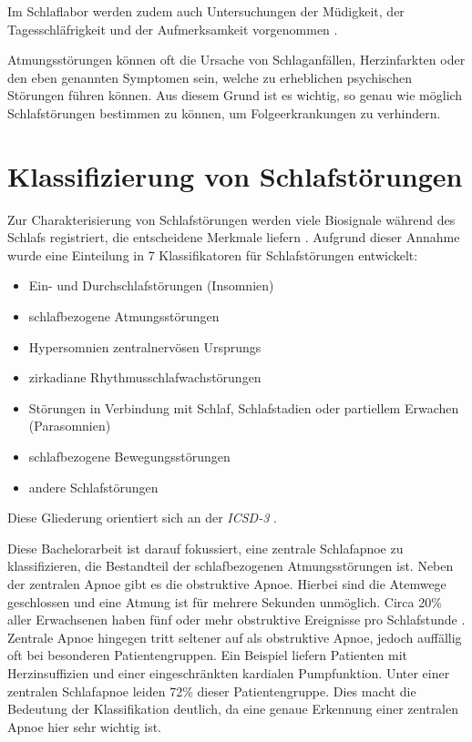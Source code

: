 Im Schlaflabor werden zudem auch Untersuchungen der Müdigkeit, der Tagesschläfrigkeit und der Aufmerksamkeit vorgenommen \cite{croenleinSchlafmedizin1x1Praxisorientiertes2017}.

Atmungsstörungen können oft die Ursache von Schlaganfällen, Herzinfarkten oder den eben genannten Symptomen sein, welche zu erheblichen psychischen Störungen führen können.
Aus diesem Grund ist es wichtig, so genau wie möglich Schlafstörungen bestimmen zu können, um Folgeerkrankungen zu verhindern. 

\section{Klassifizierung von Schlafstörungen}
\label{ch:Basics:se:classification}
Zur Charakterisierung von Schlafstörungen werden viele Biosignale während des Schlafs registriert, die entscheidene Merkmale liefern \cite{stuckPraxisSchlafmedizinDiagnostik2018}.
Aufgrund dieser Annahme wurde eine Einteilung in 7 Klassifikatoren für Schlafstörungen entwickelt:
\begin{itemize}
    \item Ein- und Durchschlafstörungen (Insomnien)
    \item schlafbezogene Atmungsstörungen
    \item Hypersomnien zentralnervösen Ursprungs
    \item zirkadiane Rhythmusschlafwachstörungen
    \item Störungen in Verbindung mit Schlaf, Schlafstadien oder partiellem Erwachen (Parasomnien)
    \item schlafbezogene Bewegungsstörungen
    \item andere Schlafstörungen
\end{itemize}

Diese Gliederung orientiert sich an der \textit{ICSD-3} \cite{stuckPraxisSchlafmedizinDiagnostik2018}.


Diese Bachelorarbeit ist darauf fokussiert, eine zentrale Schlafapnoe zu klassifizieren, die Bestandteil der {\glqq schlafbezogenen Atmungsstörungen\grqq} ist.
Neben der zentralen Apnoe gibt es die obstruktive Apnoe. 
Hierbei sind die Atemwege geschlossen und eine Atmung ist für mehrere Sekunden unmöglich.
Circa 20\% aller Erwachsenen haben fünf oder mehr obstruktive Ereignisse pro Schlafstunde \cite{croenleinSchlafmedizin1x1Praxisorientiertes2017}.
Zentrale Apnoe hingegen tritt seltener auf als obstruktive Apnoe, jedoch auffällig oft bei besonderen Patientengruppen. 
Ein Beispiel liefern Patienten mit Herzinsuffizien und einer eingeschränkten kardialen Pumpfunktion.
Unter einer zentralen Schlafapnoe leiden 72\% dieser Patientengruppe. 
Dies macht die Bedeutung der Klassifikation deutlich, da eine genaue Erkennung einer zentralen Apnoe hier sehr wichtig ist.

